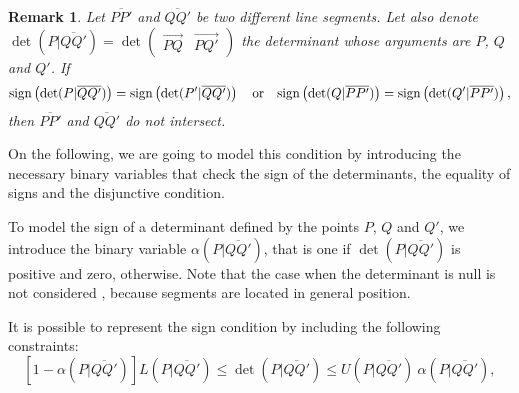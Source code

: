 \documentclass[a4paper]{elsarticle}
\newtheorem{remark}{Remark}
\begin{document}
\newcommand{\segment}[2]{\overline{#1#2}}
\newcommand{\determinant}[3]{\det({#1|\overline{#2#3}})}


\begin{remark}\label{rem:determinants}
Let $\overline{PP'}$ and $\overline{QQ'}$ be two different line segments. Let also denote $\determinant{P}{Q}{Q'}=\det\left(\begin{array}{c|c} \overrightarrow{PQ} & \overrightarrow{PQ'}\end{array}\right)$ the determinant whose arguments are $P$, $Q$ and $Q'$. If
\begin{equation*}
\normalfont{\text{sign}}\left(\determinant{P}{Q}{Q'}\right) = \normalfont{\text{sign}}\left(\determinant{P'}{Q}{Q'}\right)
\quad
\text{or}
\quad
\normalfont{\text{sign}}\left(\determinant{Q}{P}{P'}\right) = \normalfont{\text{sign}}\left(\determinant{Q'}{P}{P'}\right)
,
\end{equation*}
then $\overline{PP'}$ and $\overline{QQ'}$ do not intersect.
\end{remark}

On the following, we are going to model this condition by introducing the necessary binary variables that check the sign of the determinants, the equality of signs and the disjunctive condition.

\newcommand{\LS}[3]{L(#1|\overline{#2#3})}
\newcommand{\US}[3]{U(#1|\overline{#2#3})}
\newcommand{\alphamas}[3]{\alpha(#1|\overline{#2#3})}
\newcommand{\alphamenos}[3]{\alpha^{-}(#1|#2#3)}
\newcommand{\alphapunto}[3]{\alpha^{\cdotp}(#1|#2#3)}

To model the sign of a determinant defined by the points $P$, $Q$ and $Q'$, we introduce the binary variable $\alphamas{P}{Q}{Q'}$, that is one if $\determinant{P}{Q}{Q'}$ is positive and zero, otherwise. Note that the case when the determinant is null is not considered , because segments are located in general position.

It is possible to represent the sign condition by including the following constraints:
\begin{equation}\tag{$\alpha$-C}\label{eq:alphaC}
\left[1-\alphamas{P}{Q}{Q'}\right]\LS{P}{Q}{Q'}\leq\determinant{P}{Q}{Q'}\leq \US{P}{Q}{Q'}\:\alphamas{P}{Q}{Q'},
\end{equation}
\end{document}
